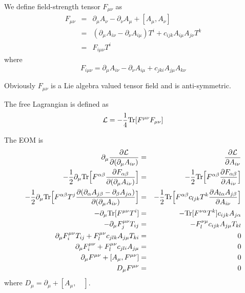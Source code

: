 \documentclass[12pt]{book}
\begin{document}
	We define field-strength tensor $F_{\mu\nu}$ as
	\begin{eqnarray}
		F_{\mu\nu}&=&\partial_\mu A_\nu-\partial_\nu A_\mu+[A_\mu,A_\nu]\\
		&=&(\partial_\mu A_{i\nu}-\partial_\nu A_{i\mu})T^i+c_{ijk}A_{i\mu}A_{j\nu}T^k\\
		&=&F_{i\mu\nu}T^i
	\end{eqnarray}
	where
	\begin{equation}
		F_{i\mu\nu}=\partial_\mu A_{i\nu}-\partial_\nu A_{i\mu}+c_{jki}A_{j\mu}A_{k\nu}
	\end{equation}
	
	Obviously $F_{\mu\nu}$ is a Lie algebra valued tensor field and is anti-symmetric.
		
	The free Lagrangian is defined as 
	\begin{equation}
		\mathcal L=-\frac 14 {\rm Tr}[F^{\mu\nu}F_{\mu\nu}] \label{eqn:lag-ym}
	\end{equation}
	
	The EOM is
	\begin{eqnarray}
		\partial_\mu\frac{\partial\mathcal L}{\partial(\partial_\mu A_{i\nu})}&=&\frac{\partial \mathcal L}{\partial A_{i\nu}}\\
		-\frac 12 \partial_\mu{\rm Tr}\Big[F^{\alpha\beta}\frac{\partial F_{\alpha\beta}}{\partial(\partial_\mu A_{i\nu})}\Big]&=&-\frac 12 {\rm Tr}\Big[F^{\alpha\beta}\frac{\partial F_{\alpha\beta}}{\partial A_{i\nu}}\Big]\\
		-\frac 12 \partial_\mu{\rm Tr}\Big[F^{\alpha\beta}T^j\frac{\partial (\partial_\alpha A_{j\beta}-\partial_\beta A_{j\alpha})}{\partial(\partial_\mu A_{i\nu})}\Big]&=&-\frac 12 {\rm Tr}\Big[F^{\alpha\beta}c_{ljk}T^k\frac{\partial A_{l\alpha}A_{j\beta}}{\partial A_{i\nu}}\Big]\\
		- \partial_\mu{\rm Tr}[F^{\mu\nu}T^i]&=&-{\rm Tr}[F^{\nu\alpha}T^k]c_{ijk}A_{j\alpha}\\
		-\partial_\mu F_j^{\mu\nu}T_{ij}&=&-F^{\nu\mu}_lc_{ijk}A_{j\mu}T_{kl}\\
		\partial_\mu F_i^{\mu\nu}T_{ij}+F^{\mu\nu}_lc_{jlk}A_{j\mu}T_{ki}&=&0\\
		\partial_\mu F_i^{\mu\nu}+F^{\mu\nu}_lc_{jli}A_{j\mu}&=&0\\
		\partial_\mu F^{\mu\nu}+[A_{\mu},F^{\mu\nu}]&=&0\\
		D_\mu F^{\mu\nu}&=&0
	\end{eqnarray}
	where $D_\mu=\partial_\mu+[A_\mu,\quad]$.
	
\end{document}
